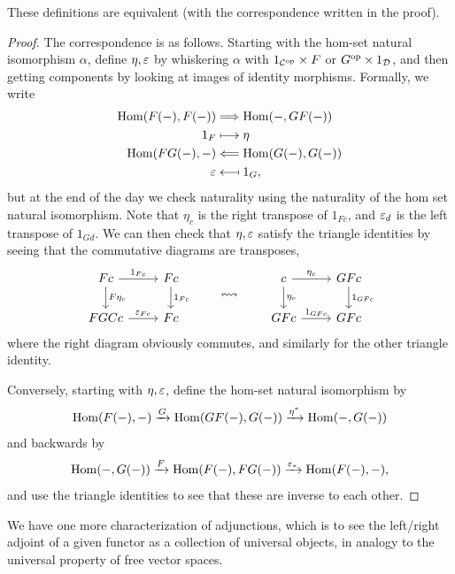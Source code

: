 \documentclass[12pt]{article}
\begin{document}
\begin{prop}
    These definitions are equivalent (with the correspondence written in the proof).
\end{prop}
\begin{proof}
    The correspondence is as follows. Starting with the hom-set natural isomorphism $\alpha$, define $\eta,\varepsilon$ by whiskering $\alpha$ with $1_{\mathcal{C}^{\mathrm{op}}}\times F$ or $G^{\mathrm{op}} \times 1_{\mathcal{D}}$, and then getting components by looking at images of identity morphisms. Formally, we write
    \begin{align*}
        \mathrm{Hom}(F(-),F(-)) &\Longrightarrow \mathrm{Hom}(-,GF(-))\\
        1_F &\longmapsto \eta\\
        \mathrm{Hom}(FG(-),-) &\Longleftarrow \mathrm{Hom}(G(-),G(-))\\
        \varepsilon &\longmapsfrom 1_G,
    \end{align*}
    but at the end of the day we check naturality using the naturality of the hom set natural isomorphism. Note that $\eta_c$ is the right transpose of $1_{Fc}$, and $\varepsilon_d$ is the left transpose of $1_{Gd}$. We can then check that $\eta,\varepsilon$ satisfy the triangle identities by seeing that the commutative diagrams are transposes,
    \[\begin{tikzcd}
        Fc \rar["1_{Fc}"] \dar["F\eta_c"] & Fc \dar["1_{Fc}"]\\
        FGCc \rar["\eps_{Fc}"] & Fc
    \end{tikzcd} \qquad\leftrightsquigarrow\qquad
    \begin{tikzcd}
        c \rar["\eta_c"] \dar["\eta_c"] & GFc \dar["1_{GFc}"]\\
        GFc \rar["1_{GFc}"] & GFc
    \end{tikzcd}\]
    where the right diagram obviously commutes, and similarly for the other triangle identity.

    Conversely, starting with $\eta,\varepsilon$, define the hom-set natural isomorphism by
    \[\mathrm{Hom}(F(-),-) \xrightarrow{G} \mathrm{Hom}(GF(-),G(-)) \xrightarrow{\eta^*} \mathrm{Hom}(-,G(-))\]
    and backwards by
    \[\mathrm{Hom}(-,G(-)) \xrightarrow{F} \mathrm{Hom}(F(-),FG(-)) \xrightarrow{\varepsilon_*} \mathrm{Hom}(F(-),-),\]
    and use the triangle identities to see that these are inverse to each other.
\end{proof}

We have one more characterization of adjunctions, which is to see the left/right adjoint of a given functor as a collection of universal objects, in analogy to the universal property of free vector spaces.
\end{document}
